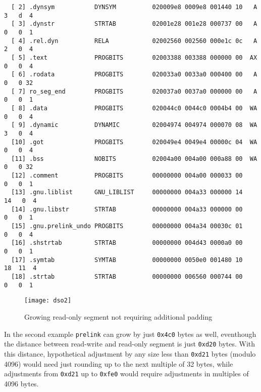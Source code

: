 \documentclass[twoside]{article}
\def\tts#1{\texttt{\small #1}}
\begin{document}
{{\begin{verbatim}
  [ 2] .dynsym           DYNSYM          020009e8 0009e8 001440 10   A  3   d  4
  [ 3] .dynstr           STRTAB          02001e28 001e28 000737 00   A  0   0  1
  [ 4] .rel.dyn          RELA            02002560 002560 000e1c 0c   A  2   0  4
  [ 5] .text             PROGBITS        02003388 003388 000000 00  AX  0   0  4
  [ 6] .rodata           PROGBITS        020033a0 0033a0 000400 00   A  0   0 32
  [ 7] ro_seg_end        PROGBITS        020037a0 0037a0 000000 00   A  0   0  1
  [ 8] .data             PROGBITS        020044c0 0044c0 0004b4 00  WA  0   0  4
  [ 9] .dynamic          DYNAMIC         02004974 004974 000070 08  WA  3   0  4
  [10] .got              PROGBITS        020049e4 0049e4 00000c 04  WA  0   0  4
  [11] .bss              NOBITS          02004a00 004a00 000a88 00  WA  0   0 32
  [12] .comment          PROGBITS        00000000 004a00 000033 00      0   0  1
  [13] .gnu.liblist      GNU_LIBLIST     00000000 004a33 000000 14     14   0  4
  [14] .gnu.libstr       STRTAB          00000000 004a33 000000 00      0   0  1
  [15] .gnu.prelink_undo PROGBITS        00000000 004a34 00030c 01      0   0  4
  [16] .shstrtab         STRTAB          00000000 004d43 0000a0 00      0   0  1
  [17] .symtab           SYMTAB          00000000 0050e0 001480 10     18  11  4
  [18] .strtab           STRTAB          00000000 006560 000744 00      0   0  1
\end{verbatim}}
}

\begin{figure}[!ht]
\centering
\texttt{[image: dso2]}
\caption{Growing read-only segment not requiring additional padding}
\end{figure}

In the second example \tts{prelink} can grow by just \tts{0x4c0} bytes as
well, eventhough the distance between read-write and read-only segment
is just \tts{0xd20} bytes.  With this distance, hypothetical adjustment
by any size less than \tts{0xd21} bytes (modulo 4096) would need just
rounding up to the next multiple of 32 bytes, while adjustments
from \tts{0xd21} up to \tts{0xfe0} would require adjustments in
multiples of 4096 bytes.
\end{document}
